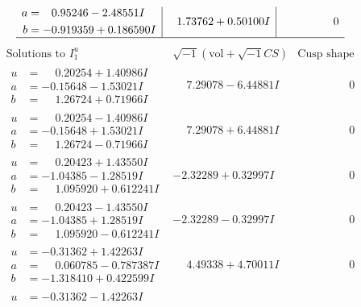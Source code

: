 \documentclass[1p]{elsarticle_modified}
\theoremstyle{definition}
\newcommand{\I}{\sqrt{-1}}
\begin{document}
$$\begin{array}{c|c|c}
\begin{aligned}
a &= \phantom{-}0.95246 - 2.48551 I \\
b &= -0.919359 + 0.186590 I\end{aligned}
 & \phantom{-}1.73762 + 0.50100 I & \phantom{-0.000000 } 0\\
 \hline 
 \end{array}$$\newpage$$\begin{array}{c|c|c}  
\text{Solutions to }I^u_{1}& \I (\text{vol} + \sqrt{-1}CS) & \text{Cusp shape}\\
 \hline 
\begin{aligned}
u &= \phantom{-}0.20254 + 1.40986 I \\
a &= -0.15648 - 1.53021 I \\
b &= \phantom{-}1.26724 + 0.71966 I\end{aligned}
 & \phantom{-}7.29078 - 6.44881 I & \phantom{-0.000000 } 0 \\ \hline\begin{aligned}
u &= \phantom{-}0.20254 - 1.40986 I \\
a &= -0.15648 + 1.53021 I \\
b &= \phantom{-}1.26724 - 0.71966 I\end{aligned}
 & \phantom{-}7.29078 + 6.44881 I & \phantom{-0.000000 } 0 \\ \hline\begin{aligned}
u &= \phantom{-}0.20423 + 1.43550 I \\
a &= -1.04385 - 1.28519 I \\
b &= \phantom{-}1.095920 + 0.612241 I\end{aligned}
 & -2.32289 + 0.32997 I & \phantom{-0.000000 } 0 \\ \hline\begin{aligned}
u &= \phantom{-}0.20423 - 1.43550 I \\
a &= -1.04385 + 1.28519 I \\
b &= \phantom{-}1.095920 - 0.612241 I\end{aligned}
 & -2.32289 - 0.32997 I & \phantom{-0.000000 } 0 \\ \hline\begin{aligned}
u &= -0.31362 + 1.42263 I \\
a &= \phantom{-}0.060785 - 0.787387 I \\
b &= -1.318410 + 0.422599 I\end{aligned}
 & \phantom{-}4.49338 + 4.70011 I & \phantom{-0.000000 } 0 \\ \hline\begin{aligned}
u &= -0.31362 - 1.42263 I \\

\end{aligned}
\end{array}$$
\end{document}
